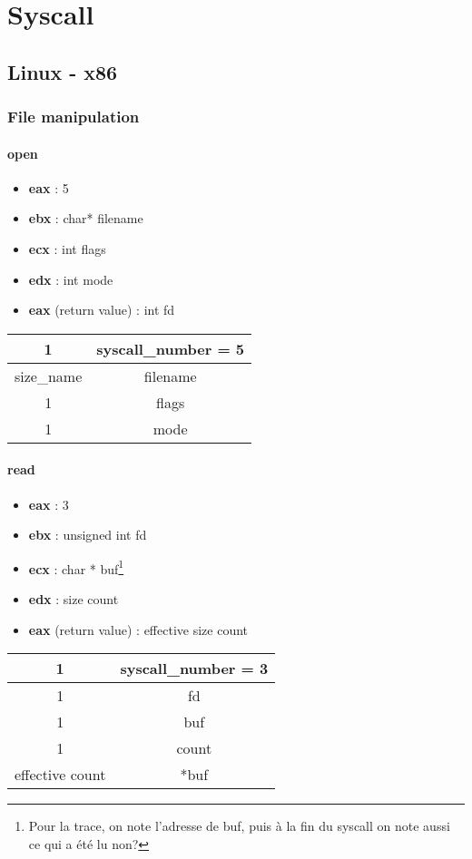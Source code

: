 \documentclass{report}
\begin{document}
\chapter{Syscall}

\section{Linux - x86}

\subsection{File manipulation}

\subsubsection*{open}

\begin{itemize}
  \item \textbf{eax} : 5
  \item \textbf{ebx} : char* filename
  \item \textbf{ecx} : int flags
  \item \textbf{edx} : int mode
  \item \textbf{eax} (return value) : int fd
\end{itemize}
\begin{tabular}{| c | c | }
\hline
1 & syscall\_number = 5 \\ \hline 
size\_name & filename \\ \hline 
1 & flags \\ \hline 
1 & mode \\ \hline
\end{tabular}

\subsubsection*{read}
\begin{itemize}
  \item \textbf{eax} : 3
  \item \textbf{ebx} : unsigned int fd
  \item \textbf{ecx} : char * buf\footnote{Pour la trace, on note l'adresse de buf, puis à la fin du syscall on note aussi ce qui a été lu non?}
  \item \textbf{edx} : size count
  \item \textbf{eax} (return value) : effective size count
\end{itemize}
\noindent
\begin{tabular}{ | c | c | }
\hline
1 & syscall\_number = 3 \\ \hline 
1 & fd \\ \hline 
1 & buf \\ \hline 
1 & count \\ \hline
effective count & *buf \\ \hline
\end{tabular}
\end{document}
